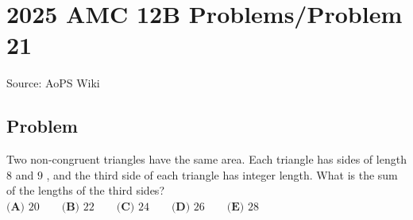 \documentclass[12pt]{article}
\begin{document}
\section*{{2025 AMC 12B Problems/Problem 21}}
Source: AoPS Wiki

\subsection*{Problem}
Two non-congruent triangles have the same area. Each triangle has sides of length $8$ and $9$ , and the third side of each triangle has integer length. What is the sum of the lengths of the third sides? $\textbf{(A) } 20 \qquad \textbf{(B) } 22 \qquad \textbf{(C) } 24 \qquad \textbf{(D) } 26 \qquad \textbf{(E) } 28$
\end{document}
